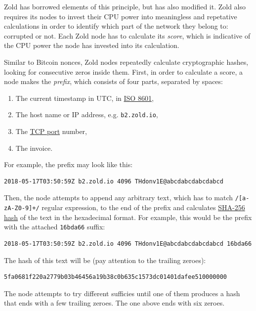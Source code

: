 \documentclass[11pt,oneside]{article}
\newcommand\dd[1]{\colorbox{gray!30}{\texttt{#1}}}
\begin{document}
Zold has borrowed elements of this principle, but has also modified it. Zold also requires
its nodes to invest their CPU power into meaningless and repetative
calculations in order to identify which part of the network they belong to:
corrupted or not. Each Zold node has to calculate its \emph{score},
which is indicative of the CPU power the node has invested into its calculation.

Similar to Bitcoin nonces, Zold nodes repeatedly calculate cryptographic hashes,
looking for consecutive zeros inside them. First, in order to calculate a score,
a node makes the \emph{prefix}, which consists of four parts,
separated by spaces:

\begin{enumerate}
\item The current timestamp in UTC, in \href{https://en.wikipedia.org/wiki/ISO_8601}{ISO 8601},
\item The host name or IP address, e.g. \dd{b2.zold.io},
\item The \href{https://en.wikipedia.org/wiki/Port_(computer_networking)}{TCP port} number,
\item The invoice.
\end{enumerate}

For example, the prefix may look like this:

\begin{verbatim}
2018-05-17T03:50:59Z b2.zold.io 4096 THdonv1E@abcdabcdabcdabcd
\end{verbatim}

Then, the node attempts to append any arbitrary text, which has to match
\dd{/[a-zA-Z0-9]+/} regular expression, to the end of the prefix and calculates
\href{https://en.wikipedia.org/wiki/SHA-2}{SHA-256 hash}
of the text in the hexadecimal format. For example, this would be the prefix
with the attached \dd{16bda66} suffix:

\begin{verbatim}
2018-05-17T03:50:59Z b2.zold.io 4096 THdonv1E@abcdabcdabcdabcd 16bda66
\end{verbatim}

The hash of this text will be (pay attention to the trailing zeroes):

\begin{verbatim}
5fa0681f220a2779b03b46456a19b38c0b635c1573dc01401dafee510000000
\end{verbatim}

The node attempts to try different sufficies until one of them produces
a hash that ends with a few trailing zeroes. The one above ends
with six zeroes.
\end{document}
